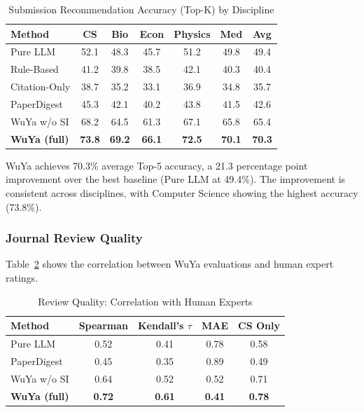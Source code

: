 \documentclass[11pt,a4paper]{article}
\begin{document}
\begin{table}[t]
\centering
\caption{Submission Recommendation Accuracy (Top-K) by Discipline}
\label{tab:recommendation-results}
\begin{tabular}{@{}lcccccc@{}}
\toprule
\textbf{Method} & \textbf{CS} & \textbf{Bio} & \textbf{Econ} & \textbf{Physics} & \textbf{Med} & \textbf{Avg} \\
\midrule
Pure LLM & 52.1 & 48.3 & 45.7 & 51.2 & 49.8 & 49.4 \\
Rule-Based & 41.2 & 39.8 & 38.5 & 42.1 & 40.3 & 40.4 \\
Citation-Only & 38.7 & 35.2 & 33.1 & 36.9 & 34.8 & 35.7 \\
PaperDigest & 45.3 & 42.1 & 40.2 & 43.8 & 41.5 & 42.6 \\
WuYa w/o SI & 68.2 & 64.5 & 61.3 & 67.1 & 65.8 & 65.4 \\
\textbf{WuYa (full)} & \textbf{73.8} & \textbf{69.2} & \textbf{66.1} & \textbf{72.5} & \textbf{70.1} & \textbf{70.3} \\
\bottomrule
\end{tabular}
\end{table}

WuYa achieves 70.3\% average Top-5 accuracy, a 21.3 percentage point improvement over the best baseline (Pure LLM at 49.4\%). The improvement is consistent across disciplines, with Computer Science showing the highest accuracy (73.8\%).

\subsubsection{Journal Review Quality}

Table~\ref{tab:review-quality} shows the correlation between WuYa evaluations and human expert ratings.

\begin{table}[t]
\centering
\caption{Review Quality: Correlation with Human Experts}
\label{tab:review-quality}
\begin{tabular}{@{}lcccc@{}}
\toprule
\textbf{Method} & \textbf{Spearman} & \textbf{Kendall's $\tau$} & \textbf{MAE} & \textbf{CS Only} \\
\midrule
Pure LLM & 0.52 & 0.41 & 0.78 & 0.58 \\
PaperDigest & 0.45 & 0.35 & 0.89 & 0.49 \\
WuYa w/o SI & 0.64 & 0.52 & 0.52 & 0.71 \\
\textbf{WuYa (full)} & \textbf{0.72} & \textbf{0.61} & \textbf{0.41} & \textbf{0.78} \\
\bottomrule
\end{tabular}
\end{table}
\end{document}
